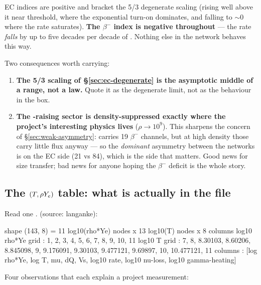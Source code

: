 EC indices are positive and bracket the 5/3 degenerate scaling (rising well
above it near threshold, where the exponential turn-on dominates, and falling to
${\sim}0$ where the rate saturates). \textbf{The $\beta^-$ index is negative
throughout} --- the rate \emph{falls} by up to five decades per decade of
\rhoye. Nothing else in the network behaves this way.

Two consequences worth carrying:

\begin{enumerate}
\item \textbf{The 5/3 scaling of \S\ref{sec:ec-degenerate} is the asymptotic
      middle of a range, not a law.} Quote it as the degenerate limit, not as
      the behaviour in the box.
\item \textbf{The \Ye-raising sector is density-suppressed exactly where the
      project's interesting physics lives} ($\rho \to 10^9$). This sharpens the
       concern of \S\ref{sec:weak-asymmetry}:  carries 19
      $\beta^-$ channels, but at high density those carry little flux anyway ---
      so the \emph{dominant} asymmetry between the networks is on the EC side
      (21 vs 84), which is the side that matters. Good news for size transfer;
      bad news for anyone hoping the $\beta^-$ deficit is the whole story.
\end{enumerate}

\subsection{The \texorpdfstring{$(T, \rho Y_{e})$}{(T, rho Ye)} table: what is actually in the file}
\label{sec:weaktable}

Read one \derivedhere{}.  (source: langanke):

\begin{srclisting}
shape (143, 8) = 11 log10(rho*Ye) nodes x 13 log10(T) nodes x 8 columns
log10 rho*Ye grid : 1, 2, 3, 4, 5, 6, 7, 8, 9, 10, 11
log10 T      grid : 7, 8, 8.30103, 8.60206, 8.845098, 9, 9.176091,
                    9.30103, 9.477121, 9.69897, 10, 10.477121, 11
columns           : [log rho*Ye, log T, mu, dQ, Vs, log10 rate,
                     log10 nu-loss, log10 gamma-heating]
\end{srclisting}

Four observations that each explain a project measurement:

